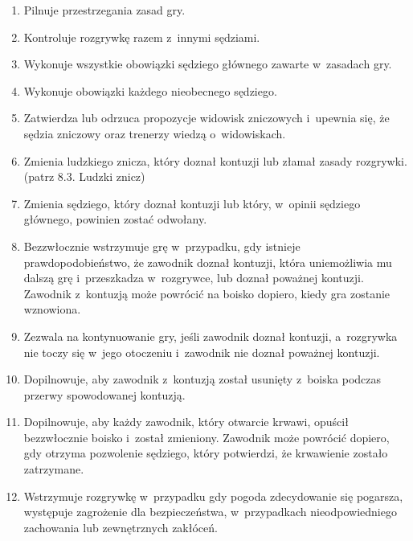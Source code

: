 \documentclass[12pt,a4paper]{article}
\begin{document}
\begin{enumerate}
	\item Pilnuje przestrzegania zasad gry.

	\item Kontroluje rozgrywkę razem z~innymi sędziami.

	\item Wykonuje wszystkie obowiązki sędziego głównego zawarte w~zasadach
	      gry.

	\item Wykonuje obowiązki każdego nieobecnego sędziego.

	\item Zatwierdza lub odrzuca propozycje widowisk zniczowych i~upewnia się,
	      że sędzia zniczowy oraz trenerzy wiedzą o~widowiskach.

	\item Zmienia ludzkiego znicza, który doznał kontuzji lub złamał zasady
	      rozgrywki. (patrz 8.3. Ludzki znicz)

	\item Zmienia sędziego, który doznał kontuzji lub który, w~opinii sędziego
	      głównego, powinien zostać odwołany.

	\item Bezzwłocznie wstrzymuje grę w~przypadku, gdy istnieje
	      prawdopodobieństwo, że zawodnik doznał kontuzji, która uniemożliwia mu
	      dalszą grę i~przeszkadza w~rozgrywce, lub doznał poważnej kontuzji.
	      Zawodnik z~kontuzją może powrócić na boisko dopiero, kiedy gra zostanie
	      wznowiona.

	\item Zezwala na kontynuowanie gry, jeśli zawodnik doznał kontuzji, a~rozgrywka nie toczy się w~jego otoczeniu i~zawodnik nie doznał poważnej
	      kontuzji.

	\item Dopilnowuje, aby zawodnik z~kontuzją został usunięty z~boiska podczas
	      przerwy spowodowanej kontuzją.

	\item Dopilnowuje, aby każdy zawodnik, który otwarcie krwawi, opuścił
	      bezzwłocznie boisko i~został zmieniony. Zawodnik może powrócić dopiero,
	      gdy otrzyma pozwolenie sędziego, który potwierdzi, że krwawienie zostało
	      zatrzymane.

	\item Wstrzymuje rozgrywkę w~przypadku gdy pogoda zdecydowanie się
	      pogarsza, występuje zagrożenie dla bezpieczeństwa, w~przypadkach
	      nieodpowiedniego zachowania lub zewnętrznych zakłóceń.


\end{enumerate}
\end{document}
